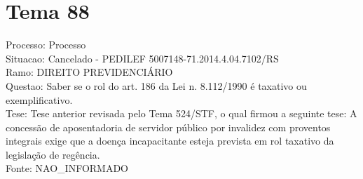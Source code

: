\documentclass[12pt]{article}
\begin{document}
\section*{Tema 88}
Processo: Processo\\
Situacao: Cancelado - PEDILEF 5007148-71.2014.4.04.7102/RS\\
Ramo: DIREITO PREVIDENCIÁRIO\\
Questao: Saber se o rol do art. 186 da Lei n. 8.112/1990 é taxativo ou exemplificativo.\\
Tese: Tese anterior revisada pelo Tema 524/STF, o qual firmou a seguinte tese: A concessão de aposentadoria de servidor público por invalidez com proventos integrais exige que a doença incapacitante esteja prevista em rol taxativo da legislação de regência.\\
Fonte: NAO\_INFORMADO
\end{document}
